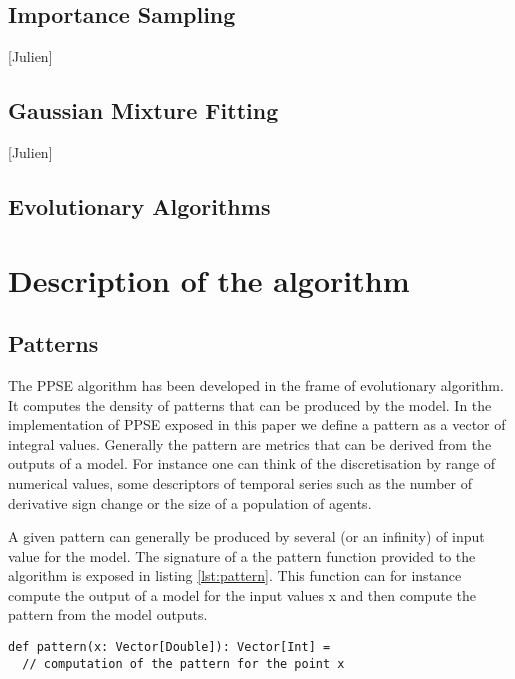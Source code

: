 \documentclass[10pt,a4paper]{article}
\theoremstyle{definition}
\theoremstyle{remark}
\begin{document}
\subsection{Importance Sampling}

[Julien]

\subsection{Gaussian Mixture Fitting}

[Julien]

\subsection{Evolutionary Algorithms}



\section{Description of the algorithm}\label{sec. algoDescription}


\subsection{Patterns}

The PPSE algorithm has been developed in the frame of evolutionary algorithm. It computes the density of patterns that can be produced by the model. In the implementation of PPSE exposed in this paper we define a pattern as a vector of integral values. Generally the pattern are metrics that can be derived from the outputs of a model. For instance one can think of the discretisation by range of numerical values, some descriptors of temporal series such as the number of derivative sign change or the size of a population of agents. 

A given pattern can generally be produced by several (or an infinity) of input value for the model. The signature of a the pattern function provided to the algorithm is exposed in listing \ref{lst:pattern}. This function can for instance compute the output of a model for the input values x and then compute the pattern from the model outputs.

\begin{lstlisting}[caption={Pattern function},label={lst:pattern}]
def pattern(x: Vector[Double]): Vector[Int] = 
  // computation of the pattern for the point x
\end{lstlisting}
\end{document}
